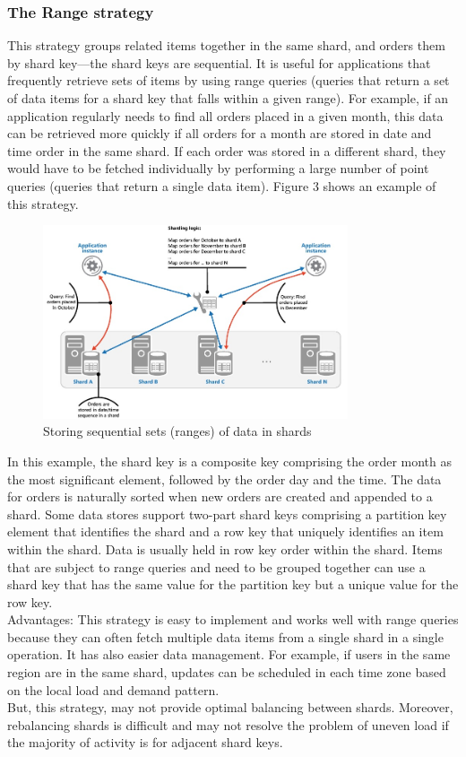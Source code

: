 \documentclass[10pt, conference]{IEEEtran}
\begin{document}
\subsubsection{The Range strategy}
\indent This strategy groups related items together in the same shard, and orders them by shard key—the shard keys are sequential. It is useful for applications that frequently retrieve sets of items by using range queries (queries that return a set of data items for a shard key that falls within a given range). For example, if an application regularly needs to find all orders placed in a given month, this data can be retrieved more quickly if all orders for a month are stored in date and time order in the same shard. If each order was stored in a different shard, they would have to be fetched individually by performing a large number of point queries (queries that return a single data item). Figure 3 shows an example of this strategy.\\
\begin{figure}[h!]
	\centering
	\includegraphics[width=9cm]{figure3.jpg}
	\caption{Storing sequential sets (ranges) of data in shards \cite{ref3}}
\end{figure} 
\indent In this example, the shard key is a composite key comprising the order month as the most significant element, followed by the order day and the time. The data for orders is naturally sorted when new orders are created and appended to a shard. Some data stores support two-part shard keys comprising a partition key element that identifies the shard and a row key that uniquely identifies an item within the shard. Data is usually held in row key order within the shard. Items that are subject to range queries and need to be grouped together can use a shard key that has the same value for the partition key but a unique value for the row key.\\
\indent Advantages: This strategy is easy to implement and works well with range queries because they can often fetch multiple data items from a single shard in a single operation. It has also easier data management. For example, if users in the same region are in the same shard, updates can be scheduled in each time zone based on the local load and demand pattern.\\
\indent But, this strategy, may not provide optimal balancing between shards. Moreover, rebalancing shards is difficult and may not resolve the problem of uneven load if the majority of activity is for adjacent shard keys. 
\end{document}
